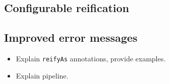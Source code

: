
\subsection{Configurable reification} %
\label{sub:Configurablereification}


\subsection{Improved error messages} %
\label{sub:Improvederrormessages}


\begin{itemize}
    \item Explain \texttt{reifyAs} annotations, provide examples.
    \item Explain pipeline.
\end{itemize}


